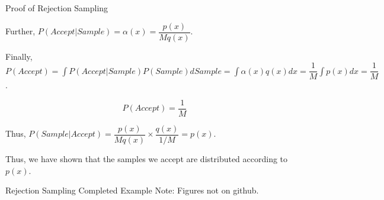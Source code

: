 \documentclass{beamer}
\begin{document}
    \begin{frame}{Proof of Rejection Sampling}

        Further, $P(Accept|Sample) = \alpha(x) = \dfrac{p(x)}{M q(x)}$.

        Finally, $P(Accept) = \int P(Accept|Sample) P(Sample) dSample = \int \alpha(x) q(x) dx = \dfrac{1}{M} \int p(x) dx = \dfrac{1}{M}$.
        \begin{tcolorbox}[colback=metropolisblue!5,colframe=metropolisblue,title={P(Accept)}]
            \begin{equation}
                P(Accept) = \frac{1}{M}
            \end{equation}
        \end{tcolorbox}
        

        Thus, $P(Sample|Accept) = \dfrac{p(x)}{M q(x)} \times \dfrac{q(x)}{1/M} = p(x)$.

        Thus, we have shown that the samples we accept are distributed according to $p(x)$.
        
    \end{frame}

    \begin{frame}{Rejection Sampling Completed Example}
        Note: Figures not on github.
    \end{frame}

        

        

\end{document}
